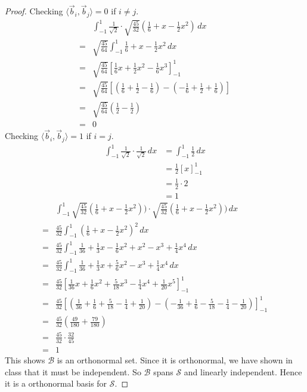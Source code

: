\documentclass{article}
\begin{document}
\begin{proof}
Checking $\langle \vec{b}_i, \vec{b}_j \rangle = 0$ if $i \ne j$.
\begin{align*}
& \int^{1}_{-1} \frac{1}{\sqrt{2}} \cdot \sqrt{\frac{45}{32}}(\frac{1}{6}+x-\frac{1}{2}x^2) \, dx \\
=& \sqrt{\frac{45}{64}} \int^{1}_{-1} \frac{1}{6}+x-\frac{1}{2}x^2 \, dx \\
=& \sqrt{\frac{45}{64}} [\frac{1}{6}x+\frac{1}{2} x^2 - \frac{1}{6}x^3]_{-1}^{1} \\
=& \sqrt{\frac{45}{64}}[(\frac{1}{6}+\frac{1}{2}-\frac{1}{6}) - (-\frac{1}{6}+\frac{1}{2}+\frac{1}{6})] \\
=& \sqrt{\frac{45}{64}} (\frac{1}{2}-\frac{1}{2}) \\
=& 0
\end{align*}
Checking $\langle \vec{b}_i, \vec{b}_j \rangle = 1$ if $i = j$.
\begin{align*}
\int_{-1}^{1} \frac{1}{\sqrt{2}} \cdot \frac{1}{\sqrt{2}} \, dx &= \int_{-1}^{1} \frac{1}{2} \, dx \\
&= \frac{1}{2} [x]_{-1}^{1} \\
&= \frac{1}{2} \cdot 2 \\
&= 1
\end{align*}
\begin{align*}
& \int_{-1}^{1}  \sqrt{\frac{45}{32}}(\frac{1}{6}+x-\frac{1}{2}x^2)) \cdot  \sqrt{\frac{45}{32}}(\frac{1}{6}+x-\frac{1}{2}x^2)) \, dx \\
=& \frac{45}{32} \int_{-1}^{1} (\frac{1}{6}+x-\frac{1}{2}x^2)^2 \, dx \\
=& \frac{45}{32} \int_{-1}^{1} \frac{1}{36} + \frac{1}{3}x - \frac{1}{6}x^2 +x^2 -x^3 +\frac{1}{4}x^4 \, dx \\
=& \frac{45}{32} \int_{-1}^{1} \frac{1}{36} + \frac{1}{3}x +\frac{5}{6}x^2  -x^3 +\frac{1}{4}x^4 \, dx \\
=& \frac{45}{32} [\frac{1}{36}x + \frac{1}{6}x^2 +\frac{5}{18}x^3- \frac{1}{4}x^4+\frac{1}{20}x^5]^{1}_{-1} \\
=& \frac{45}{32} [(\frac{1}{36} + \frac{1}{6} +\frac{5}{18}- \frac{1}{4}+\frac{1}{20}) -(-\frac{1}{36} + \frac{1}{6} -\frac{5}{18}- \frac{1}{4}-\frac{1}{20})]^{1}_{-1} \\
=& \frac{45}{32} (\frac{49}{180}+\frac{79}{180}) \\
=&\frac{45}{32} \cdot \frac{32}{45} \\
=& 1
\end{align*}
This shows $\mathcal{B}$ is an orthonormal set. Since it is orthonormal, we have shown in class that it must be independent. So $\mathcal{B}$ spans $\mathcal{S}$ and linearly independent. Hence it is a orthonormal basis for $\mathcal{S}$.


\end{proof}
\end{document}
